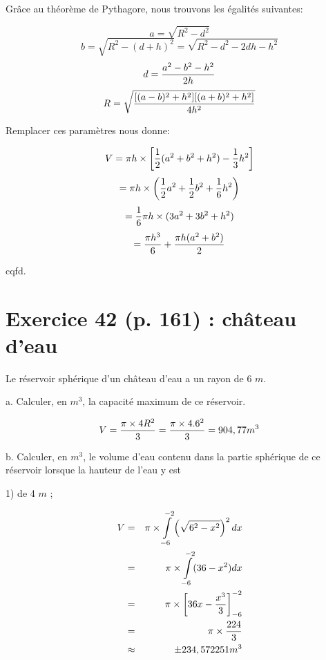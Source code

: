 \documentclass[10pt]{article}
\begin{document}
Grâce au théorème de Pythagore, nous trouvons les égalités suivantes:

$$a=\sqrt{R^2-d^2}$$
$$b=\sqrt{R^2-(d+h)^2} = \sqrt{R^2-d^2-2dh-h^2}$$
$$d={a^2-b^2-h^2\over{2h}}$$
$$R= \sqrt{{[(a-b)^2+h^2][(a+b)^2+h^2]\over{4h^2}}}$$\vspace{0.1cm}

Remplacer ces paramètres nous donne:

$$V = \pi h \times \left[{1\over{2}}(a^2+b^2+h^2)-{1\over{3}}h^2 \right]$$
$$= \pi h \times \left( {1\over{2}}a^2 + {1\over{2}}b^2 + {1\over{6}}h^2 \right)$$
$$={1\over{6}} \pi h \times (3a^2 + 3b^2 + h^2 )$$
$$={\pi h^3\over{6}} + {\pi h (a^2+b^2)\over{2}}$$

\begin{center}
cqfd.
\end{center}

\section*{Exercice 42 (p. 161) : château d'eau}\vspace{0.2cm}

\flushleft Le réservoir sphérique d'un château d'eau a un rayon de 6 $m$.\vspace{0.1cm}

a. Calculer, en $m^3$, la capacité maximum de ce réservoir.

$$V = {\pi \times 4R^2\over{3}} = {\pi \times 4.6^2\over{3}} = 904,77 m^3$$\vspace{0.1cm}

b. Calculer, en $m^3$, le volume d'eau contenu dans la partie sphérique de ce réservoir lorsque la hauteur de l'eau y est

\hspace{1cm}1) de 4 $m$ ;

\begin{eqnarray*}
V&=&\pi \times \int\limits_{-6}^{-2} \left( \sqrt{6^2-x^2} \right)^2dx\\
&=&\pi \times \int\limits_{-6}^{-2} (36-x^2)dx\\
&=&\pi \times \left[ 36x-{x^3\over{3}} \right]_{-6}^{-2}\\
&=&\pi \times \frac{224}{3}\\
&\approx&\pm 234,572251 m^3
\end{eqnarray*}
\end{document}
